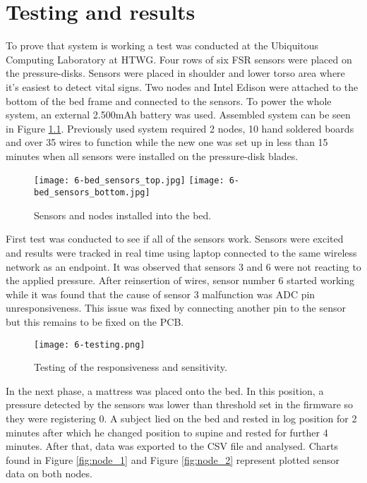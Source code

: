 \chapter{Testing and results}
\label{chap:results}

To prove that system is working a test was conducted at the Ubiquitous Computing Laboratory at \ac{HTWG}. Four rows of six \ac{FSR} sensors were placed on the pressure-disks. Sensors were placed in shoulder and lower torso area where it's easiest to detect vital signs. Two nodes and Intel Edison were attached to the bottom of the bed frame and connected to the sensors. To power the whole system, an external 2.500mAh battery was used. Assembled system can be seen in Figure \ref{fig:bed_sensors}. Previously used system required 2 nodes, 10 hand soldered boards and over 35 wires to function while the new one was set up in less than 15 minutes when all sensors were installed on the pressure-disk blades.

\begin{figure}[h]
  \begin{center}
    \texttt{[image: 6-bed\_sensors\_top.jpg]}
    \vspace{0.5cm}
    \texttt{[image: 6-bed\_sensors\_bottom.jpg]}
  \end{center}
  \caption{Sensors and nodes installed into the bed.}
  \label{fig:bed_sensors}
\end{figure}

First test was conducted to see if all of the sensors work. Sensors were excited and results were tracked in real time using laptop connected to the same wireless network as an endpoint. It was observed that sensors 3 and 6 were not reacting to the applied pressure. After reinsertion of wires, sensor number 6 started working while it was found that the cause of sensor 3 malfunction was \ac{ADC} pin unresponsiveness. This issue was fixed by connecting another pin to the sensor but this remains to be fixed on the \ac{PCB}.

\begin{figure}[h]
  \begin{center}
    \texttt{[image: 6-testing.png]}
  \end{center}
  \caption{Testing of the responsiveness and sensitivity.}
  \label{fig:testing}
\end{figure}

In the next phase, a mattress was placed onto the bed. In this position, a pressure detected by the sensors was lower than threshold set in the firmware so they were registering 0. A subject lied on the bed and rested in log position for 2 minutes after which he changed position to supine and rested for further 4 minutes. After that, data was exported to the CSV file and analysed. Charts found in Figure \ref{fig:node_1} and Figure \ref{fig:node_2} represent plotted sensor data on both nodes.

